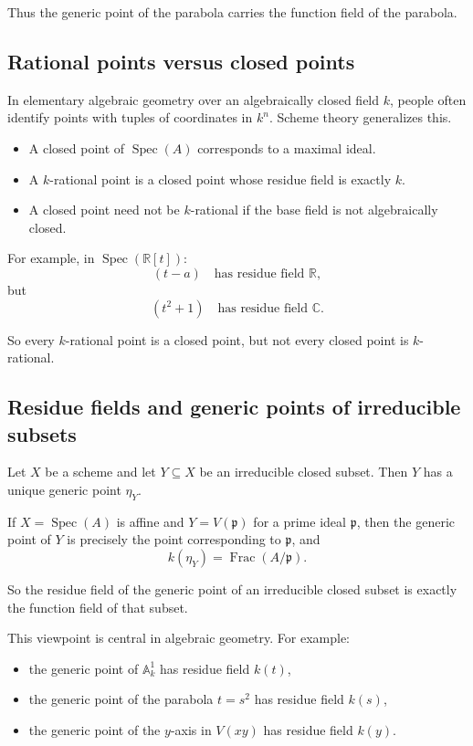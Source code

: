 \documentclass[12pt,a4paper]{article}
\theoremstyle{notespace}
\newcommand{\Spec}{\operatorname{Spec}}
\newcommand{\Frac}{\operatorname{Frac}}
\newcommand{\A}{\mathbb A}
\newcommand{\R}{\mathbb R}
\newcommand{\C}{\mathbb C}
\newcommand{\p}{\mathfrak p}
\theoremstyle{definition}
\begin{document}
Thus the generic point of the parabola carries the function field of the parabola.

\subsection{Rational points versus closed points}

In elementary algebraic geometry over an algebraically closed field \(k\), people often identify points with tuples of coordinates in \(k^n\).  
Scheme theory generalizes this.

\begin{itemize}[leftmargin=2em]
	\item A closed point of \(\Spec(A)\) corresponds to a maximal ideal.
	\item A \(k\)-rational point is a closed point whose residue field is exactly \(k\).
	\item A closed point need not be \(k\)-rational if the base field is not algebraically closed.
\end{itemize}

For example, in \(\Spec(\R[t])\):
\[
(t-a)\quad \text{has residue field } \R,
\]
but
\[
(t^2+1)\quad \text{has residue field } \C.
\]

So every \(k\)-rational point is a closed point, but not every closed point is \(k\)-rational.

\subsection{Residue fields and generic points of irreducible subsets}

Let \(X\) be a scheme and let \(Y\subseteq X\) be an irreducible closed subset.  
Then \(Y\) has a unique generic point \(\eta_Y\).

If \(X=\Spec(A)\) is affine and \(Y=V(\p)\) for a prime ideal \(\p\), then the generic point of \(Y\) is precisely the point corresponding to \(\p\), and
\[
k(\eta_Y)=\Frac(A/\p).
\]

So the residue field of the generic point of an irreducible closed subset is exactly the function field of that subset.

This viewpoint is central in algebraic geometry.  
For example:

\begin{itemize}[leftmargin=2em]
	\item the generic point of \(\A^1_k\) has residue field \(k(t)\),
	\item the generic point of the parabola \(t=s^2\) has residue field \(k(s)\),
	\item the generic point of the \(y\)-axis in \(V(xy)\) has residue field \(k(y)\).
\end{itemize}
\end{document}
